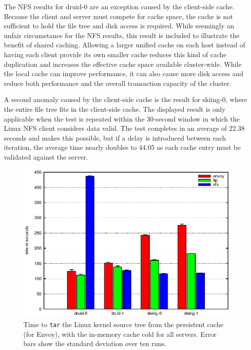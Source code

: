 The NFS results for druid-0 are an exception caused by the client-side cache. Because the client and server must compete for cache space, the cache is not sufficient to hold the file tree and disk access is required. While seemingly an unfair circumstance for the NFS results, this result is included to illustrate the benefit of shared caching. Allowing a larger unified cache on each host instead of having each client provide its own smaller cache reduces this kind of cache duplication and increases the effective cache space available cluster-wide. While the local cache can improve performance, it can also cause more disk access and reduce both performance and the overall transaction capacity of the cluster.

A second anomaly caused by the client-side cache is the result for skiing-0, where the entire file tree fits in the client-side cache. The displayed result is only applicable when the test is repeated within the 30-second window in which the Linux NFS client considers data valid. The test completes in an average of 22.38 seconds and makes this possible, but if a delay is introduced between each iteration, the average time nearly doubles to 44.05 as each cache entry must be validated against the server.

\begin{figure}[t]
\centering
\includegraphics[width=\figwidth]{figures/arch-tar-warm}
\caption[\texttt{tar} benchmark results with a warm cache]{Time to \texttt{tar} the Linux kernel source tree from the persistent cache (for Envoy), with the in-memory cache cold for all servers. Error bars show the standard deviation over ten runs.}
\label{fig:arch-tar-warm}
\end{figure}

